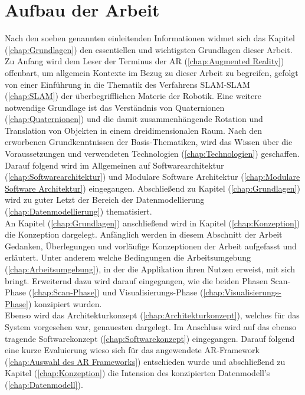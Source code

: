\section{Aufbau der Arbeit}
\label{chap:Aufbau der Arbeit}
Nach den soeben genannten einleitenden Informationen widmet sich das Kapitel (\ref{chap:Grundlagen}) den essentiellen und wichtigsten 
Grundlagen dieser Arbeit. Zu Anfang wird dem Leser der Terminus der \acl{AR} (\ref{chap:Augmented Reality}) offenbart, um allgemein 
Kontexte im Bezug zu dieser Arbeit zu begreifen, gefolgt von einer Einführung in die Thematik des Verfahrens \ac{SLAM}-\acl{SLAM} 
(\ref{chap:SLAM}) der überbegrifflichen Materie der Robotik. Eine weitere notwendige Grundlage ist das Verständnis von Quaternionen 
(\ref{chap:Quaternionen}) und die damit zusammenhängende Rotation und Translation von Objekten in einem dreidimensionalen Raum. Nach 
den erworbenen Grundkenntnissen der Basis-Thematiken, wird das Wissen über die Voraussetzungen und verwendeten Technologien 
(\ref{chap:Technologien}) geschaffen. Darauf folgend wird im Allgemeinen auf Softwarearchitektur %
(\ref{chap:Softwarearchitektur}) und Modulare Software Architektur (\ref{chap:Modulare Software Architektur}) eingegangen. Abschließend zu 
Kapitel (\ref{chap:Grundlagen}) wird zu guter Letzt der Bereich der Datenmodellierung (\ref{chap:Datenmodellierung}) thematisiert.
\\ 
\linebreak
An Kapitel (\ref{chap:Grundlagen}) anschließend wird in Kapitel (\ref{chap:Konzeption}) die Konzeption dargelegt. Anfänglich werden in 
diesem Abschnitt der Arbeit Gedanken, Überlegungen und vorläufige Konzeptionen der Arbeit aufgefasst und erläutert. Unter anderem 
welche Bedingungen die Arbeitsumgebung (\ref{chap:Arbeitsumgebung}), in der die Applikation ihren Nutzen erweist, mit sich bringt. 
Erweiternd dazu wird darauf eingegangen, wie die beiden Phasen Scan-Phase (\ref{chap:Scan-Phase}) und Visualisierungs-Phase 
(\ref{chap:Visualisierungs-Phase}) konzipiert wurden. 
\\ 
Ebenso wird das Architekturkonzept (\ref{chap:Architekturkonzept}), welches für das System vorgesehen war, genauesten dargelegt. 
Im Anschluss wird auf das ebenso tragende Softwarekonzept (\ref{chap:Softwarekonzept}) eingegangen. Darauf folgend eine kurze Evaluierung wieso sich 
für das angewendete \acs{AR}-Framework (\ref{chap:Auswahl des AR Frameworks}) entschieden wurde und abschließend zu Kapitel 
(\ref{chap:Konzeption}) die Intension des konzipierten Datenmodell's (\ref{chap:Datenmodell}). 
